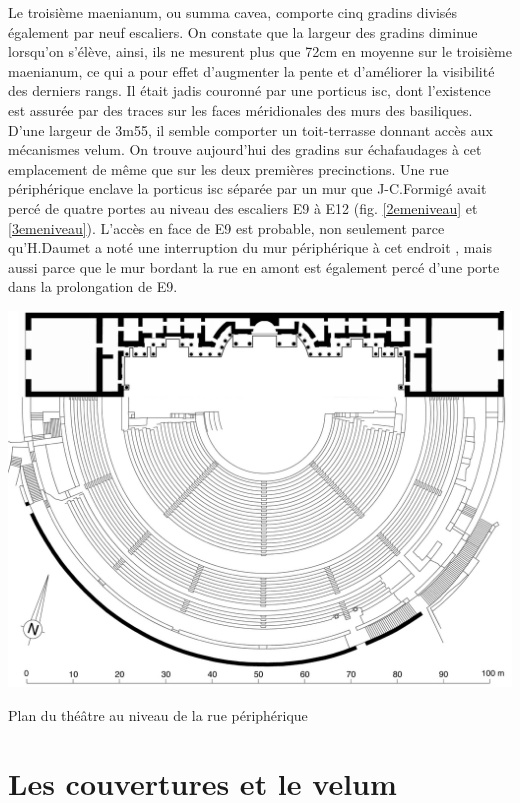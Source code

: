 		Le troisième \gls{maenianum}, ou \gls{summa cavea}, comporte cinq gradins divisés également par neuf escaliers. On constate que la largeur des gradins diminue lorsqu'on s'élève, ainsi, ils ne mesurent plus que 72cm en moyenne sur le troisième \gls{maenianum}, ce qui a pour effet d'augmenter la pente et d'améliorer la visibilité des derniers rangs. Il était jadis couronné par une \gls{porticus isc}, dont l'existence est assurée par des traces sur les faces méridionales des murs des \glspl{basilique}. D'une largeur de 3m55, il semble comporter un toit-terrasse donnant accès aux mécanismes \gls{velum}. On trouve aujourd'hui des gradins sur échafaudages à cet emplacement de même que sur les deux premières \glspl{precinction}. Une rue périphérique enclave la \gls{porticus isc} séparée par un mur que J-C.Formigé avait percé de quatre portes au niveau des escaliers E9 à E12 (fig. \ref{2emeniveau} et \ref{3emeniveau}). L'accès en face de E9 est probable, non seulement parce qu'H.Daumet a noté une interruption du mur périphérique à cet endroit \cite[Pl. VII]{orangePl}, mais aussi parce que le mur bordant la rue en amont est également percé d'une porte dans la prolongation de E9.


	\begin{figureth}
		\includegraphics[width=\linewidth]{images/3emeniveau}
		\caption[Vue de dessus - 3ème niveau]{Plan du théâtre au niveau de la rue périphérique \footnotemark }
		\label{3emeniveau}
	\end{figureth}	
		
\section{Les couvertures et le \gls{velum}}
		
